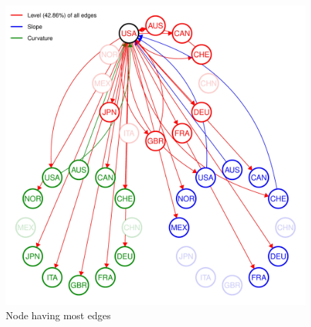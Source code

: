 \documentclass[12pt,bibliography=totoc]{article}
\begin{document}
\begin{figure}[H]
\caption{Node having most edges}
\includegraphics[width=11.5cm]{USA_B_1_plot_2004-07-01_2019-12-31_0.01-page-001}
\centering
\end{figure}


\newpage







\end{document}
